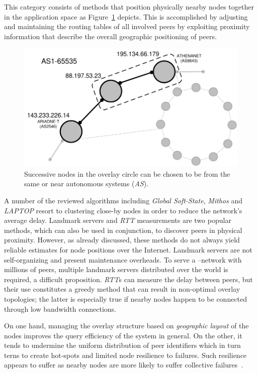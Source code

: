This category consists of methods that 
position physically nearby nodes together in the application space as 
Figure~\ref{figure:geographic-layout} depicts. 
This is accomplished by adjusting and maintaining the routing tables 
of all involved peers by exploiting proximity information 
that describe the overall geographic positioning of peers. 
\begin{figure}[ht]
\centering
  \includegraphics[scale=0.4]{img/pdf/geographic-layout.pdf}
\caption{Successive nodes in the overlay circle can be chosen to be from the
same or near autonomous systems (\emph{AS}).}
\label{figure:geographic-layout}
\end{figure}
A number of the reviewed algorithms including 
\emph{Global Soft-State},
\emph{Mithos} and \emph{LAPTOP} resort to clustering close-by nodes in
order to reduce the network's average delay.
Landmark servers and \emph{RTT} measurements are two popular methods, which
can also be used in conjunction, to discover peers in physical proximity.
However, as already discussed, these
methods do not always yield reliable estimates for node positions over the
Internet. 
Landmark servers are not self-organizing and present maintenance
overheads. 
To serve a \p--network with millions of peers, multiple landmark
servers distributed over the world is required, a difficult proposition.
\emph{RTT}s can measure the delay between peers, but their use constitutes a
greedy method that can result in non-optimal overlay topologies;
the latter is especially true if nearby 
nodes happen to be connected through low bandwidth connections.

On one hand, managing the overlay structure based on \emph{geographic layout} 
of the nodes improves the query efficiency of the system in general. 
On the other, it tends to undermine the uniform distribution 
of peer identifiers which in turn terns to create 
hot-spots and limited node resilience to failures.
Such resilience appears to suffer as
nearby nodes are more likely to suffer collective failures~\cite{HY2007}.


